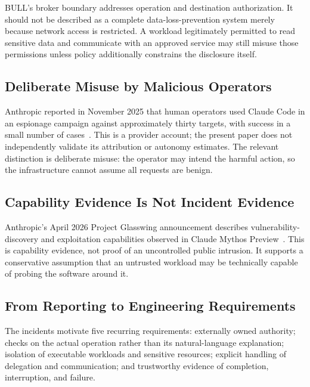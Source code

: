 \documentclass[journal]{IEEEtran}
\newcommand{\bull}{\textsc{BULL}}
\begin{document}
\bull's broker boundary addresses operation and destination authorization. It should not be described as a complete data-loss-prevention system merely because network access is restricted. A workload legitimately permitted to read sensitive data and communicate with an approved service may still misuse those permissions unless policy additionally constrains the disclosure itself.

\subsection{Deliberate Misuse by Malicious Operators}
Anthropic reported in November 2025 that human operators used Claude Code in an espionage campaign against approximately thirty targets, with success in a small number of cases~\cite{Anthropic2025}. This is a provider account; the present paper does not independently validate its attribution or autonomy estimates. The relevant distinction is deliberate misuse: the operator may intend the harmful action, so the infrastructure cannot assume all requests are benign.

\subsection{Capability Evidence Is Not Incident Evidence}
Anthropic's April 2026 Project Glasswing announcement describes vulnerability-discovery and exploitation capabilities observed in Claude Mythos Preview~\cite{Anthropic2026}. This is capability evidence, not proof of an uncontrolled public intrusion. It supports a conservative assumption that an untrusted workload may be technically capable of probing the software around it.

\subsection{From Reporting to Engineering Requirements}
The incidents motivate five recurring requirements: externally owned authority; checks on the actual operation rather than its natural-language explanation; isolation of executable workloads and sensitive resources; explicit handling of delegation and communication; and trustworthy evidence of completion, interruption, and failure.
\end{document}
